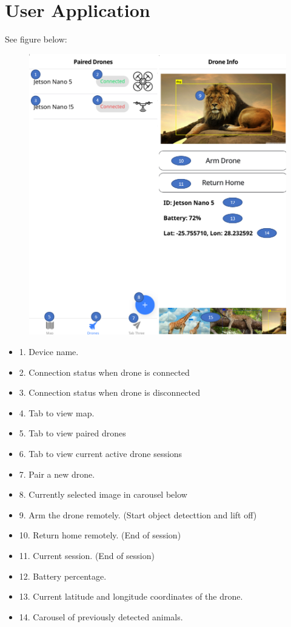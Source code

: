 \section{ User Application }
See figure below:
\begin{figure}[h!]
	\centering
	\includegraphics[scale=0.8]{./assets/images/screen.png}
	\label{fig: screens}
	\caption{}
\end{figure}
\begin{itemize}
		\item 1. Device name.
		\item 2. Connection status when drone is connected
		\item 3. Connection status when drone is disconnected
		\item 4. Tab to view map.
		\item 5. Tab to view paired drones
		\item 6. Tab to view current active drone sessions
		\item 7. Pair a new drone.
		\item 8. Currently selected image in carousel below
		\item 9. Arm the drone remotely. (Start object detecttion and lift off)
		\item 10. Return home remotely. (End of session)
		\item 11. Current session. (End of session)
		\item 12. Battery percentage.
		\item 13. Current latitude and longitude coordinates of the drone.
		\item 14. Carousel of previously detected animals.
		
\end{itemize}



